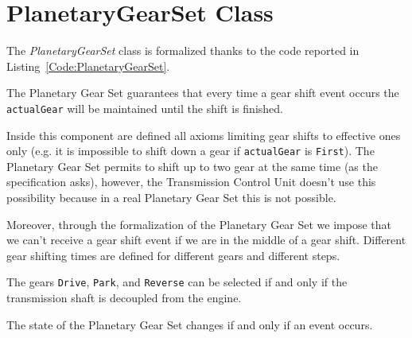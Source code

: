 \section{PlanetaryGearSet Class}
\label{Section:PlanetaryGearSet}
The \emph{PlanetaryGearSet} class is formalized thanks to the code reported in Listing~\ref{Code:PlanetaryGearSet}.

The Planetary Gear Set guarantees that every time a gear shift event occurs the \texttt{actualGear} will be maintained until the shift is finished.

Inside this component are defined all axioms limiting gear shifts to effective ones only (e.g. it is impossible to shift down a gear if \texttt{actualGear} is \texttt{First}). The Planetary Gear Set permits to shift up to two gear at the same time (as the specification asks), however, the Transmission Control Unit doesn't use this possibility because in a real Planetary Gear Set this is not possible.

Moreover, through the formalization of the Planetary Gear Set we impose that we can't receive a gear shift event if we are in the middle of a gear shift. Different gear shifting times are defined for different gears and different steps.

The gears \texttt{Drive}, \texttt{Park}, and \texttt{Reverse} can be selected if and only if the transmission shaft is decoupled from the engine.

The state of the Planetary Gear Set changes if and only if an event occurs.


